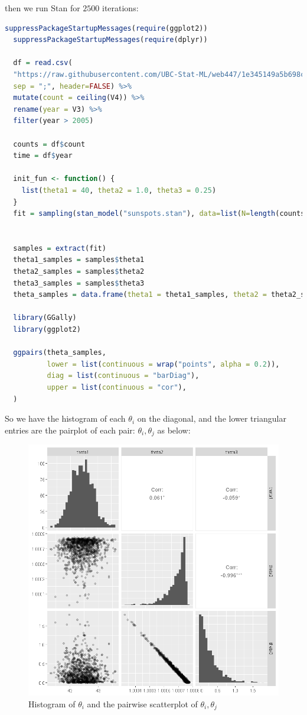 \documentclass{article}
\begin{document}
then we run Stan for $2500$ iterations:
\begin{lstlisting}[language=R]
  suppressPackageStartupMessages(require(ggplot2))
  suppressPackageStartupMessages(require(dplyr))

  df = read.csv(
  "https://raw.githubusercontent.com/UBC-Stat-ML/web447/1e345149a5b698ccdf0a7e9b0aeabec2463c50ca/data/sunspots-SN_m_tot_V2.0.csv",
  sep = ";", header=FALSE) %>%
  mutate(count = ceiling(V4)) %>%
  rename(year = V3) %>%
  filter(year > 2005)

  counts = df$count 
  time = df$year

  init_fun <- function() {
    list(theta1 = 40, theta2 = 1.0, theta3 = 0.25)
  }
  fit = sampling(stan_model("sunspots.stan"), data=list(N=length(counts), y=counts, t=time), chains=1, iter=2500, init = init_fun, control = list(max_treedepth = 15))


  samples = extract(fit)
  theta1_samples = samples$theta1
  theta2_samples = samples$theta2
  theta3_samples = samples$theta3
  theta_samples = data.frame(theta1 = theta1_samples, theta2 = theta2_samples, theta3 = theta3_samples)

  library(GGally)
  library(ggplot2)

  ggpairs(theta_samples, 
          lower = list(continuous = wrap("points", alpha = 0.2)),
          diag = list(continuous = "barDiag"),
          upper = list(continuous = "cor"),
  )
\end{lstlisting}
So we have the histogram of each $\theta_i$ on the diagonal, and the lower triangular entries are the pairplot of each pair: $\theta_i, \theta_j$ as below:
\begin{figure}[H]
  \centering
  \includegraphics[width=\textwidth, height=0.55\textheight]{output.png}
  \caption{Histogram of $\theta_i$ and the pairwise scatterplot of $\theta_i, \theta_j$}
  \label{fig:pairplot}
\end{figure}
\end{document}
